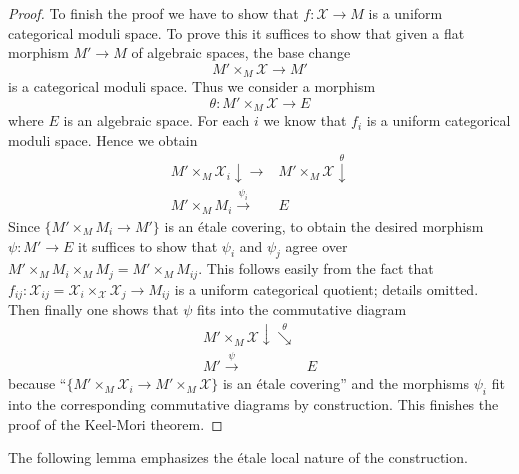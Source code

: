 \begin{proof}
\medskip\noindent
To finish the proof we have to show that $f : \mathcal{X} \to M$
is a uniform categorical moduli space.
To prove this it suffices to show that given a flat morphism
$M' \to M$ of algebraic spaces, the base change
$$
M' \times_M \mathcal{X} \longrightarrow M'
$$
is a categorical moduli space. Thus we consider a morphism
$$
\theta : M' \times_M \mathcal{X} \longrightarrow E
$$
where $E$ is an algebraic space. For each $i$ we know that
$f_i$ is a uniform categorical moduli space. Hence we obtain
$$
\begin{array}{cc}M' \times_M \mathcal{X}_i \downarrow\longrightarrow & M' \times_M \mathcal{X} \overset{\theta}{\downarrow} \\ M' \times_M M_i \overset{\psi_i}{\longrightarrow} & E\end{array}
$$
Since $\{M' \times_M M_i \to M'\}$ is an \'etale covering,
to obtain the desired morphism $\psi : M' \to E$ it suffices
to show that $\psi_i$ and $\psi_j$ agree over
$M' \times_M M_i \times_M M_j = M' \times_M M_{ij}$.
This follows easily from the fact that
$f_{ij} : \mathcal{X}_{ij} =
\mathcal{X}_i \times_\mathcal{X} \mathcal{X}_j \to M_{ij}$ is a uniform
categorical quotient; details omitted.
Then finally one shows that $\psi$ fits into the commutative diagram
$$
\begin{array}{cc}M' \times_M \mathcal{X} \downarrow\overset{\theta}{\searrow} &  \\ M' \overset{\psi}{\longrightarrow} & E\end{array}
$$
because ``$\{M' \times_M \mathcal{X}_i \to M' \times_M \mathcal{X}\}$
is an \'etale covering'' and the morphisms $\psi_i$ fit into the
corresponding commutative diagrams by construction.
This finishes the proof of the Keel-Mori theorem.
\end{proof}

The following lemma emphasizes the \'etale local nature of the construction.

